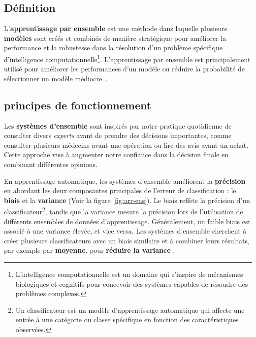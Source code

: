 \subsection{Définition}

L'\textbf{apprentissage par ensemble} est une méthode dans laquelle plusieurs \textbf{modèles} sont créés et combinés de manière stratégique pour améliorer la performance et la robustesse dans la résolution d'un problème spécifique d'intelligence computationnelle\footnote{L'intelligence computationnelle est un domaine qui s'inspire de mécanismes biologiques et cognitifs pour concevoir des systèmes capables de résoudre des problèmes complexes.}. L'apprentissage par ensemble est principalement utilisé pour améliorer les performances d'un modèle ou réduire la probabilité de sélectionner un modèle médiocre~\cite{Machine2020Batta}. 

\subsection{principes de fonctionnement}
Les \textbf{systèmes d'ensemble} sont inspirés par notre pratique quotidienne de consulter divers \textit{experts} avant de prendre des décisions importantes, comme consulter plusieurs médecins avant une opération ou lire des avis avant un achat. Cette approche vise à augmenter notre confiance dans la décision finale en combinant différentes opinions.

En apprentissage automatique, les systèmes d'ensemble améliorent la \textbf{précision} en abordant les deux composantes principales de l'erreur de classification : le \textbf{biais} et la \textbf{variance} (Voir la figure \ref{fig:arr-ens}). Le biais reflète la précision d'un classificateur\footnote{Un classificateur est un modèle d'apprentissage automatique qui affecte une entrée à une catégorie ou classe spécifique en fonction des caractéristiques observées.}, tandis que la variance mesure la précision lors de l'utilisation de différents ensembles de données d'apprentissage. Généralement, un faible biais est associé à une variance élevée, et vice versa. Les systèmes d'ensemble cherchent à créer plusieurs classificateurs avec un biais similaire et à combiner leurs résultats, par exemple par \textbf{moyenne}, pour \textbf{réduire la variance} \cite{polikar2012ensemble}.

